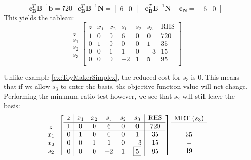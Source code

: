 \begin{example}
\begin{displaymath}
\mathbf{c}_\mathbf{B}^T\mathbf{B}^{-1}\mathbf{b} = 720 \;\;\;
\mathbf{c}_\mathbf{B}^T\mathbf{B}^{-1}\mathbf{N} = \begin{bmatrix}6 & 0\end{bmatrix}\;\;\;
\mathbf{c}_\mathbf{B}^T\mathbf{B}^{-1}\mathbf{N} - \mathbf{c_N} = 
\begin{bmatrix}6 & 0\end{bmatrix}
\end{displaymath}
This yields the tableau:
\begin{equation}
\begin{array}{c}
\\
z\\
s_1\\
s_2\\
s_3
\end{array}
\left[
\begin{array}{c|ccccc|c}
z& x_1 & x_2 & s_1 & s_2 & s_3 & \text{RHS}\\
\hline
1 &  0 & 0 & 6 & 0 & \textbf{0} & 720\\
\hline
0 &  1 & 0 & 0 & 0 & 1  		 & 35\\
0 &  0 & 1 & 1 & 0 & -3 		 & 15\\
0 &  0 & 0 & -2& 1 & 5 		 	 & 95\\
\end{array}\right]
\end{equation}

Unlike example \ref{ex:ToyMakerSimplex}, the reduced cost for $s_3$ is $0$. This means that if we allow $s_3$ to enter the basis, the objective function value will not change. Performing the minimum ratio test however, we see that $s_2$ will still leave the basis:
\begin{equation}
\begin{array}{c}
\\
z\\
x_1\\
x_2\\
s_2
\end{array}
\left[
\begin{array}{c|ccccc|c}
z& x_1 & x_2 & s_1 & s_2 & s_3 & \text{RHS}\\
\hline
1 &  0 & 0 & 6 & 0 & \textbf{0} & 720\\
\hline
0 &  1 & 0 & 0 & 0 & 1  		 & 35\\
0 &  0 & 1 & 1 & 0 & -3 		 & 15\\
0 &  0 & 0 & -2& 1 & \fbox{5} 		 	 & 95\\
\end{array}\right]
\begin{array}{c}
\text{MRT ($s_3$)}\\
\hline
\\
35\\
-\\
19
\end{array}
\end{equation}



\end{example}
